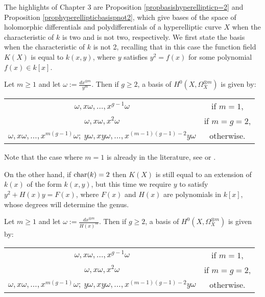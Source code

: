 The highlights of Chapter 3 are Proposition \ref{propbasishyperellipticp=2} and Proposition \ref{prophyperellipticbasispnot2}, which give bases of the space of holomorphic differentials and polydifferentials of a hyperelliptic curve $X$ when the characteristic of $k$ is two and is not two, respectively.
We first state the basis when the characteristic of $k$ is not 2, recalling that in this case the function field $K(X)$ is equal to $k(x,y)$, where $y$ satisfies $y^2 = f(x)$ for some polynomial $f(x) \in k[x]$.
    \begin{unnumprop}
    Let $m\geq 1$ and let $\omega := \frac{dx^{\otimes m}}{y^m}$. 
    Then if $g\geq 2$, a basis of $H^0(X,\Omega_X^{\otimes m})$ is given by:
        {\centering 
        \begin{tabular}{c c}
        $\omega, x\omega, \ldots , x^{g-1}\omega$ &  if $m=1$, \\
        $\omega, x\omega, x^2\omega$  &  if $m=g=2$, \\
        $\omega, x\omega, \ldots, x^{m(g-1)}\omega;\  y\omega, xy\omega, \ldots, x^{(m-1)(g-1)-2}y\omega$ &  otherwise.
        \end{tabular}\par
        }
    \end{unnumprop}
    
Note that the case where $m=1$ is already in the literature, see \cite[Prop. 7.4.26]{liu} or \cite[Ch. IV, \S 4, Prop. 4.3]{griffiths}.
 
On the other hand, if $\operatorname{char}(k) = 2$ then $K(X)$ is still equal to an extension of $k(x)$ of the form $k(x,y)$, but this time we require $y$ to satisfy $y^2 + H(x)y = F(x)$, where $F(x)$ and $H(x)$ are polynomials in $k[x]$, whose degrees will determine the genus.
    \begin{unnumprop}
    Let $m\geq 1$ and let $\omega:= \frac{dx^{\otimes m}}{H(x)^m}$. 
    Then if $g\geq 2$, a basis of $H^0(X,\Omega_X^{\otimes m})$ is given by:\\
        {\centering
        \begin{tabular}{c c}
        $\omega, x\omega, \ldots , x^{g-1}\omega$ &  if $m=1$, \\
        $\omega, x\omega, x^2\omega$ & if $m=g=2$, \\
        $\omega, x\omega, \ldots, x^{m(g-1)}\omega;\  y\omega, xy\omega, \ldots, x^{(m-1)(g-1)-2}y\omega$ & otherwise.
        \end{tabular}\par
        }
    \end{unnumprop}
    
